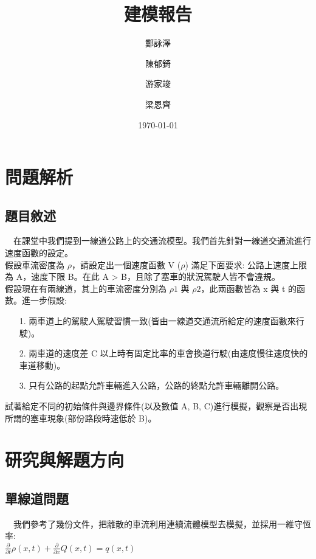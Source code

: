 \documentclass[a4paper, 11pt]{report}
\title{\textbf{建模報告}}
\author{鄭詠澤\and 陳郁錡\and 游家竣\and 梁恩齊}
\date{\today}
\begin{document}
\maketitle
\tableofcontents

\chapter{問題解析}

\section{題目敘述}

$\quad$在課堂中我們提到一線道公路上的交通流模型。我們首先針對一線道交通流進行速度函數的設定。\\

假設車流密度為 $\rho$，請設定出一個速度函數 V ($\rho$) 滿足下面要求:
公路上速度上限為 A，速度下限 B。在此 A > B，且除了塞車的狀況駕駛人皆不會違規。\\

假設現在有兩線道，其上的車流密度分別為 $\rho 1$ 與 $\rho 2$，此兩函數皆為 x 與 t 的函數。進一步假設:

\begin{itemize}
\item[1.] 兩車道上的駕駛人駕駛習慣一致(皆由一線道交通流所給定的速度函數來行駛)。

\item[2.] 兩車道的速度差 C 以上時有固定比率的車會換道行駛(由速度慢往速度快的車道移動)。
 
\item[3.] 只有公路的起點允許車輛進入公路，公路的終點允許車輛離開公路。
\end{itemize}

試著給定不同的初始條件與邊界條件(以及數值 A, B, C)進行模擬，觀察是否出現所謂的塞車現象(部份路段時速低於 B)。

\chapter{研究與解題方向}
\section{單線道問題}

$\quad$我們參考了幾份文件\cite{Lighthill}\cite{traffic2016research}\cite{model}，把離散的車流利用連續流體模型去模擬，並採用一維守恆率:\\

$\frac{\partial}{\partial t} \rho(x, t) + \frac{\partial}{\partial x} Q(x, t) = q(x, t)$\\
\end{document}
